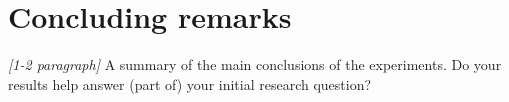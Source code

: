 \documentclass[11pt]{article}
\begin{document}
\section{Concluding remarks}
\label{se:conclusions}
\emph{[1-2 paragraph]}
A summary of the main conclusions of the experiments. Do your results help answer (part of) your initial research question?
\end{document}
